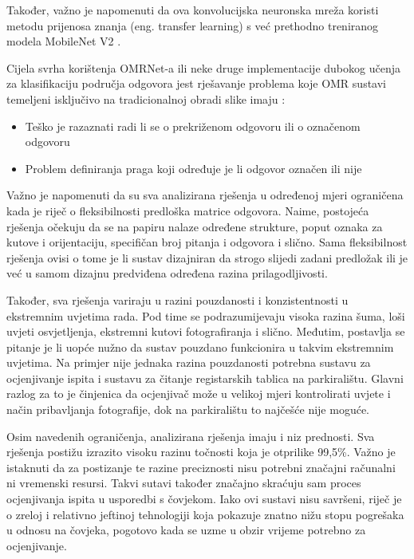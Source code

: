 \documentclass{foi}
\begin{document}
Također, važno je napomenuti da ova konvolucijska neuronska mreža koristi metodu prijenosa znanja (eng. transfer learning) s već prethodno treniranog modela MobileNet V2 \cite{omrnet}.

Cijela svrha korištenja OMRNet-a ili neke druge implementacije dubokog učenja za klasifikaciju područja odgovora jest rješavanje problema koje OMR sustavi temeljeni isključivo na tradicionalnoj obradi slike imaju \cite{omrnet}:

\begin{flushleft}
\begin{itemize}
\item Teško je razaznati radi li se o prekriženom odgovoru ili o označenom odgovoru
\item Problem definiranja praga koji određuje je li odgovor označen ili nije
\end{itemize}
\end{flushleft}

Važno je napomenuti da su sva analizirana rješenja u određenoj mjeri ograničena kada je riječ o fleksibilnosti predloška matrice odgovora. Naime, postojeća rješenja očekuju da se na papiru nalaze određene strukture, poput oznaka za kutove i orijentaciju, specifičan broj pitanja i odgovora i slično. Sama fleksibilnost rješenja ovisi o tome je li sustav dizajniran da strogo slijedi zadani predložak ili je već u samom dizajnu predviđena određena razina prilagodljivosti.

Također, sva rješenja variraju u razini pouzdanosti i konzistentnosti u ekstremnim uvjetima rada. Pod time se podrazumijevaju visoka razina šuma, loši uvjeti osvjetljenja, ekstremni kutovi fotografiranja i slično. Međutim, postavlja se pitanje je li uopće nužno da sustav pouzdano funkcionira u takvim ekstremnim uvjetima. Na primjer nije jednaka razina pouzdanosti potrebna sustavu za ocjenjivanje ispita i sustavu za čitanje registarskih tablica na parkiralištu. Glavni razlog za to je činjenica da ocjenjivač može u velikoj mjeri kontrolirati uvjete i način pribavljanja fotografije, dok na parkiralištu to najčešće nije moguće.

Osim navedenih ograničenja, analizirana rješenja imaju i niz prednosti. Sva rješenja postižu izrazito visoku razinu točnosti koja je otprilike 99,5\%. Važno je istaknuti da za postizanje te razine preciznosti nisu potrebni značajni računalni ni vremenski resursi. Takvi sutavi također značajno skraćuju sam proces ocjenjivanja ispita u usporedbi s čovjekom. Iako ovi sustavi nisu savršeni, riječ je o zreloj i relativno jeftinoj tehnologiji koja pokazuje znatno nižu stopu pogrešaka u odnosu na čovjeka, pogotovo kada se uzme u obzir vrijeme potrebno za ocjenjivanje.
\end{document}
